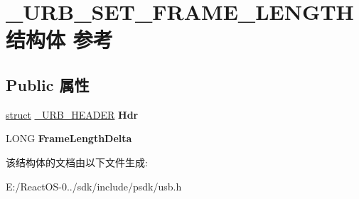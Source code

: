 \hypertarget{struct___u_r_b___s_e_t___f_r_a_m_e___l_e_n_g_t_h}{}\section{\+\_\+\+U\+R\+B\+\_\+\+S\+E\+T\+\_\+\+F\+R\+A\+M\+E\+\_\+\+L\+E\+N\+G\+T\+H结构体 参考}
\label{struct___u_r_b___s_e_t___f_r_a_m_e___l_e_n_g_t_h}
\subsection*{Public 属性}
\begin{DoxyCompactItemize}
\item 
\mbox{\label{struct___u_r_b___s_e_t___f_r_a_m_e___l_e_n_g_t_h_a4665d24a9bf668b9954eec156a0492af}} 
\hyperlink{interfacestruct}{struct} \hyperlink{struct___u_r_b___h_e_a_d_e_r}{\+\_\+\+U\+R\+B\+\_\+\+H\+E\+A\+D\+ER} {\bfseries Hdr}
\item 
\mbox{\label{struct___u_r_b___s_e_t___f_r_a_m_e___l_e_n_g_t_h_a4bda3151fd04b0eac08b0de7cc8e5db4}} 
L\+O\+NG {\bfseries Frame\+Length\+Delta}
\end{DoxyCompactItemize}


该结构体的文档由以下文件生成\+:\begin{DoxyCompactItemize}
\item 
E\+:/\+React\+O\+S-\/0../sdk/include/psdk/usb.\+h\end{DoxyCompactItemize}
